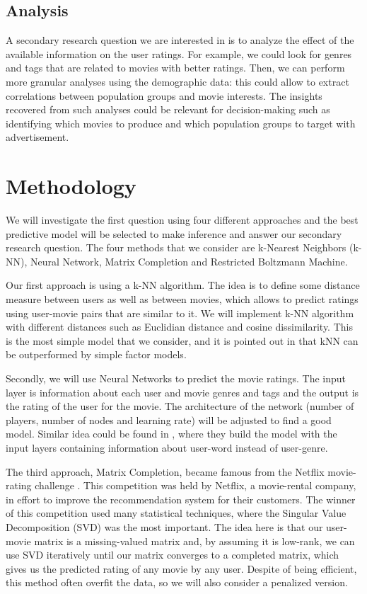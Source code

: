 \documentclass[bj, preprint]{imsart}
\begin{document}
\subsection{Analysis}

A secondary research question we are interested in is to analyze the effect of the available information on the user ratings. For example, we could look for genres and tags that are related to movies with better ratings. Then, we can perform more granular analyses using the demographic data: this could allow to extract correlations between population groups and movie interests. The insights recovered from such analyses could be relevant for decision-making such as identifying which movies to produce and which population groups to target with advertisement.

\section{Methodology}\label{sec:setting}
We will investigate the first question using four different approaches and the best predictive model will be selected to make inference and answer our secondary research question. The four methods that we consider are k-Nearest Neighbors (k-NN), Neural Network, Matrix Completion and Restricted Boltzmann Machine. 

Our first approach is using a k-NN algorithm. The idea is to define some distance measure between users as well as between movies, which allows to predict ratings using user-movie pairs that are similar to it. We will implement k-NN algorithm with different distances such as Euclidian distance and cosine dissimilarity. This is the most simple model that we consider, and it is pointed out in \cite{toscher2009bigchaos} that kNN can be outperformed by simple factor models.

Secondly, we will use Neural Networks to predict the movie ratings. The input layer is information about each user and movie genres and tags and the output is the rating of the user for the movie. The architecture of the network (number of players, number of nodes and learning rate) will be adjusted to find a good model. Similar idea could be found in \cite{tang2015user}, where they build the model with the input layers containing information about user-word instead of user-genre. 

The third approach, Matrix Completion, became famous from the Netflix movie-rating challenge \cite{bennett2007netflix}. This competition was held by Netflix, a movie-rental company, in effort to improve the recommendation system for their customers. The winner of this competition used many statistical techniques, where the Singular Value Decomposition (SVD) was the most important. The idea here is that our user-movie matrix is a missing-valued matrix and, by assuming it is low-rank, we can use SVD iteratively until our matrix converges to a completed matrix, which gives us the predicted rating of any movie by any user. Despite of being efficient, this method often overfit the data, so we will also consider a penalized version.
\end{document}

